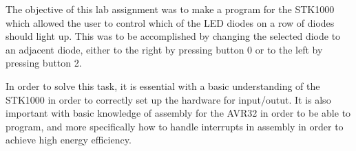 The objective of this lab assignment was to make a program for the STK1000 which allowed the user to control which of the LED diodes on a row of diodes should light up.
This was to be accomplished by changing the selected diode to an adjacent diode, either to the right by pressing button 0 or to the left by pressing button 2.

In order to solve this task, it is essential with a basic understanding of the STK1000 in order to correctly set up the hardware for input/outut.
It is also important with basic knowledge of assembly for the AVR32 in order to be able to program, and more specifically how to handle interrupts in assembly in order to achieve high energy efficiency.

